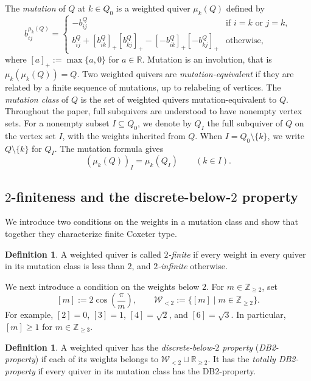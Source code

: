 \documentclass[11pt,reqno]{amsart}
\numberwithin{equation}{section}
\theoremstyle{definition}
\newtheorem{definition}[example]{Definition}
\theoremstyle{plain}
\newcommand{\bra}[1]{\left[#1\right]}
\begin{document}
	The \emph{mutation} of $Q$ at $k\in Q_0$ is a weighted quiver $\mu_k(Q)$ defined by
	\begin{equation}\label{eq:quiver-mutation}
		b_{ij}^{\mu_k(Q)}=
		\begin{cases}
			-b_{ij}^Q & \text{if $i=k$ or $j=k$},\\
			b_{ij}^Q+[b_{ik}^Q]_+[b_{kj}^Q]_+
			-[-b_{ik}^Q]_+[-b_{kj}^Q]_+ & \text{otherwise},
		\end{cases}
	\end{equation}
	where $[a]_+:=\max\{a,0\}$ for $a\in\mathbb R$. Mutation is an involution, that is $\mu_k(\mu_k(Q))=Q$. Two weighted quivers are \emph{mutation-equivalent} if they are related by a finite sequence of mutations, up to relabeling of vertices. The \emph{mutation class} of $Q$ is the set of weighted quivers mutation-equivalent to $Q$. Throughout the paper, full subquivers are understood to have nonempty vertex sets. For a nonempty subset $I\subseteq Q_0$, we denote by $Q_I$ the full subquiver of $Q$ on the vertex set $I$, with the weights inherited from $Q$. When $I = Q_0 \setminus \{k\}$, we write $Q \setminus \{k\}$ for $Q_I$. The mutation formula gives
	\begin{equation}\label{eq:restriction-mutation}
		(\mu_k(Q))_I=\mu_k(Q_I)\qquad(k\in I).
	\end{equation}

\subsection{\texorpdfstring{$2$}{2}-finiteness and the discrete-below-$2$ property}\label{sec:2fin-DB2}
	We introduce two conditions on the weights in a mutation class and show that together they characterize finite Coxeter type.
	
	\begin{definition}\label{def:2finite}
		A weighted quiver is called \emph{$2$-finite} if every weight in every quiver in its mutation class is less than $2$, and \emph{$2$-infinite} otherwise.
	\end{definition}
	
	We next introduce a condition on the weights below $2$. For $m\in\mathbb Z_{\geq2}$, set
	\[
	\bra{m}:=2\cos\left(\frac{\pi}{m}\right),
	\qquad
	\mathcal W_{<2}:=\{\bra{m}\mid m\in\mathbb Z_{\geq2}\}.
	\]
	For example, $\bra{2}=0$, $\bra{3}=1$, $\bra{4}=\sqrt2$, and $\bra{6}=\sqrt3$. In particular, $\bra{m}\geq1$ for $m\in\mathbb Z_{\geq3}$.
	
	\begin{definition}\label{def:DB2}
		A weighted quiver has the \emph{discrete-below-$2$ property} (\emph{DB2-property}) if each of its weights belongs to $\mathcal W_{<2}\sqcup\mathbb R_{\geq2}$. It has the \emph{totally DB2-property} if every quiver in its mutation class has the DB2-property.
	\end{definition}
	
\end{document}
